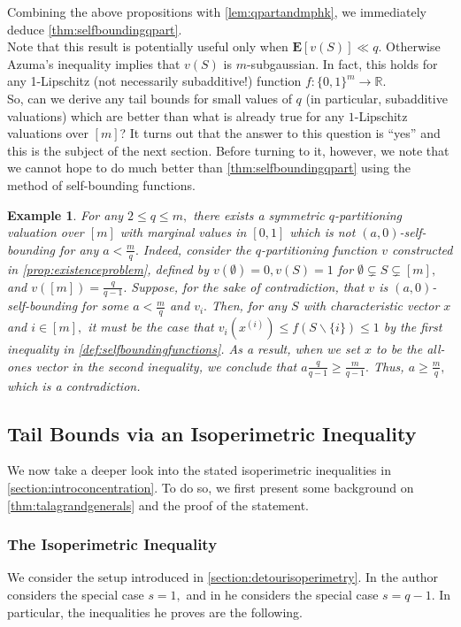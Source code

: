 \documentclass[11pt]{article}\usepackage{amsfonts}
\newtheorem{example}[theorem]{Example}
\numberwithin{theorem}{subsection}
\newcommand{\expect}{\mathbf{E}}
\begin{document}
\noindent
Combining the above propositions with \cref{lem:qpartandmphk}, we immediately deduce \cref{thm:selfboundingqpart}.\\

\noindent
Note that this result is potentially useful only when $\expect[v(S)] \ll q.$ Otherwise Azuma's inequality \cite{Azuma} implies that $v(S)$ is $m$-subgaussian. In fact, this holds for any 1-Lipschitz (not necessarily subadditive!) function $f:\{0,1\}^m\longrightarrow \mathbb{R}.$\\

\noindent
So, can we derive any tail bounds for
small values of $q$ (in particular, subadditive valuations) which are better than what is already true for any $1$-Lipschitz valuations over $[m]$? It turns out that the answer to this question is ``yes'' and this is the subject of the next section. Before turning to it, however, we note that we cannot hope to do much better than \cref{thm:selfboundingqpart}
using the method of self-bounding functions.

\begin{example}
\normalfont
For any $2\le q\le m,$ there exists a symmetric $q$-partitioning valuation over $[m]$ with marginal values in $[0,1]$ which is not $(a,0)$-self-bounding for any $a<\frac{m}{q}.$ Indeed, consider the $q$-partitioning function $v$ constructed in \cref{prop:existenceproblem}, defined by $v(\emptyset) = 0, v(S) = 1$ for $\emptyset \subsetneq S\subsetneq [m],$ and 
$v([m]) = \frac{q}{q-1}.$ Suppose, for the sake of contradiction, that $v$ is $(a,0)$-self-bounding for some $a<\frac{m}{q}$ and $v_i.$
Then, for any $S$ with characteristic vector $x$ and $i\in [m],$ it must be the case that $v_i(x^{(i)})\le f(S\backslash \{i\}) \le 1$ by the first inequality in \cref{def:selfboundingfunctions}. As a result, when we set $x$ to be the all-ones vector in the second inequality, we conclude that $a\frac{q}{q-1}\ge \frac{m}{q-1}.$ Thus, $a\ge \frac{m}{q},$ which is a contradiction.
\end{example}

\subsection{Tail Bounds via an Isoperimetric Inequality}
We now 
take a deeper look into the stated isoperimetric inequalities in \cref{section:introconcentration}. To do so, we first present some background on
\cref{thm:talagrandgenerals} and the proof of the statement. 
\subsubsection{The Isoperimetric Inequality}
We consider the setup introduced in \cref{section:detourisoperimetry}.
In \cite[Section 3.1.1]{Talagrand01} the author considers the special case $s = 1,$ and in \cite[Section 5.7]{Talagrand96} he considers the special case $s = q-1.$ In particular, the inequalities he proves are the following.
\end{document}
